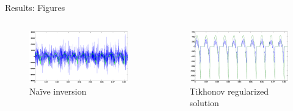 \documentclass[final]{beamer}
\begin{document}
\begin{frame}[t]
\begin{columns}[t]
\begin{column}{.465\textwidth}

\begin{block}{Results: Figures}


\begin{columns}

\begin{column}{.5\textwidth}
\begin{center}
\begin{figure}
\includegraphics[width=.95\linewidth]{naive_test_nocrime.eps}
\caption{Naïve inversion}
\label{fig:naive}
\end{figure}
\end{center}
\end{column}

\begin{column}{.5\textwidth}
\begin{center}
\begin{figure}
\includegraphics[width=.9\linewidth]{naive_test_nocrime_morozov.eps}
\caption{Tikhonov regularized solution}
\label{fig:naive-tik}
\end{figure}
\end{center}
\end{column}


\end{columns}
\end{block}
\end{column}
\end{columns}
\end{frame}
\end{document}
